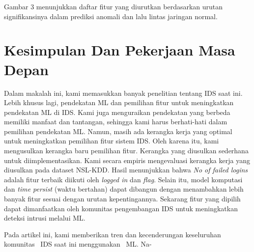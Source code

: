 \documentclass[conference]{IEEEtran}
\begin{document}
Gambar 3 menunjukkan daftar fitur yang diurutkan berdasarkan urutan signifikansinya dalam prediksi anomali dan lalu lintas jaringan normal.

\section{Kesimpulan Dan Pekerjaan Masa Depan}

Dalam makalah ini, kami memasukkan banyak penelitian tentang IDS saat ini. Lebih khusus lagi, pendekatan ML dan pemilihan fitur untuk meningkatkan pendekatan ML di IDS.
Kami juga menguraikan pendekatan yang berbeda memiliki manfaat dan tantangan, sehingga kami harus berhati-hati dalam pemilihan pendekatan ML.
Namun, masih ada kerangka kerja yang optimal untuk meningkatkan pemilihan fitur sistem IDS. Oleh karena itu, kami mengusulkan kerangka baru pemilihan fitur. Kerangka yang diusulkan sederhana untuk diimplementasikan.
Kami secara empiris mengevaluasi kerangka kerja yang diusulkan pada dataset NSL-KDD.
Hasil menunjukkan bahwa \emph{No of failed logins} adalah fitur terbaik diikuti oleh \emph{logged in} dan \emph{flag}.
Selain itu, model komputasi dan \emph{time persist} (waktu bertahan) dapat dibangun dengan menambahkan lebih banyak fitur sesuai dengan urutan kepentingannya.
Sekarang fitur yang dipilih dapat dimanfaatkan oleh komunitas pengembangan IDS untuk meningkatkan deteksi intrusi melalui ML.

Pada artikel ini, kami memberikan tren dan kecenderungan keseluruhan komunitas ~IDS saat ini menggunakan ~ML. Na-
\end{document}
